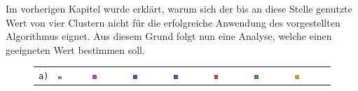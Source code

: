 Im vorherigen Kapitel wurde erklärt, warum sich der bis an diese Stelle genutzte Wert von vier Clustern nicht für die erfolgreiche Anwendung des vorgestellten Algorithmus eignet. Aus diesem Grund folgt nun eine Analyse, welche einen geeigneten Wert bestimmen soll.

\begin{figure}[h!]
	\setlength\tabcolsep{1pt}
	\def\arraystretch{0.5}
	\begin{tabular}{m{15pt}m{}m{}m{}m{}m{}m{}m{}}
		\texttt{a)} &
		\includegraphics[width=0.13\textwidth]{images/p03/p03_01.png} &
		\includegraphics[width=0.13\textwidth]{images/gen/number_of_segments/p03_01.png_5.png} &
		\includegraphics[width=0.13\textwidth]{images/gen/number_of_segments/p03_01.png_10.png} &
		\includegraphics[width=0.13\textwidth]{images/gen/number_of_segments/p03_01.png_20.png} &
		\includegraphics[width=0.13\textwidth]{images/gen/number_of_segments/p03_01.png_50.png} &
		\includegraphics[width=0.13\textwidth]{images/gen/number_of_segments/p03_01.png_75.png} &
		\includegraphics[width=0.13\textwidth]{images/gen/number_of_segments/p03_01.png_100.png} \\

\end{tabular}
\end{figure}
